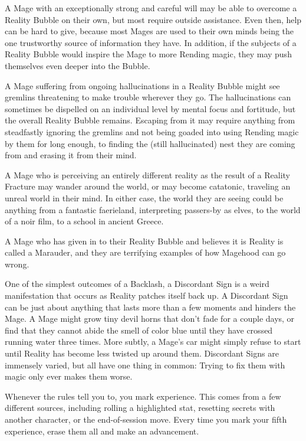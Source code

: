 \documentclass[letterpaper,12pt]{article}
\newcommand{\SECTION}[1]{\vspace{.5em}{\noindent\titlefont\large\textbf{#1}}

}
\begin{document}
A Mage with an exceptionally strong and careful will may be
able to overcome a Reality Bubble on their own, but most require
outside assistance. Even then, help can be hard to give, because most
Mages are used to their own minds being the one trustworthy source of
information they have. In addition, if the subjects of a Reality
Bubble would inspire the Mage to more Rending magic, they may push
themselves even deeper into the Bubble.

A Mage suffering from ongoing hallucinations in a Reality Bubble might
see gremlins threatening to make trouble wherever they go. The
hallucinations can sometimes be dispelled on an individual level by
mental focus and fortitude, but the overall Reality Bubble
remains. Escaping from it may require anything from steadfastly
ignoring the gremlins and not being goaded into using Rending magic by
them for long enough, to finding the (still hallucinated) nest they
are coming from and erasing it from their mind.

A Mage who is perceiving an entirely different reality as the result
of a Reality Fracture may wander around the world, or may become
catatonic, traveling an unreal world in their mind. In either case,
the world they are seeing could be anything from a fantastic
faerieland, interpreting passers-by as elves, to the world of a noir
film, to a school in ancient Greece.

A Mage who has given in to their Reality Bubble and believes it is
Reality is called a Marauder, and they are terrifying examples of how
Magehood can go wrong.


\SECTION{Discordant Sign}
One of the simplest outcomes of a Backlash, a Discordant Sign is a weird
manifestation that occurs as Reality patches itself back up. A
Discordant Sign can be just about anything that lasts more than a few
moments and hinders the Mage. A Mage might grow tiny devil horns that
don't fade for a couple days, or find that they cannot abide the smell
of color blue until they have crossed running water three times. More
subtly, a Mage's car might simply refuse to start until Reality has
become less twisted up around them. Discordant Signs are immensely
varied, but all have one thing in common: Trying to fix them with
magic only ever makes them worse.

\SECTION{Experience}
Whenever the rules tell you to, you mark experience. This comes from a
few different sources, including rolling a highlighted stat, resetting
secrets with another character, or the end-of-session move. Every time
you mark your fifth experience, erase them all and make an
advancement.
\end{document}
